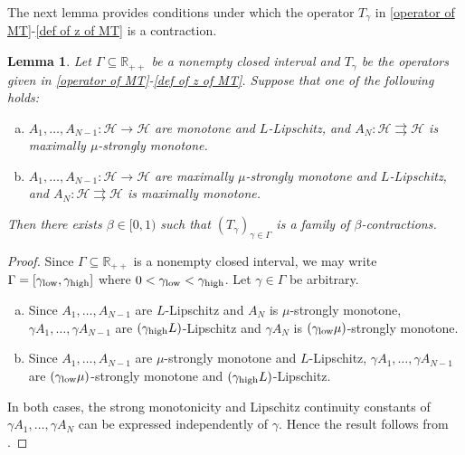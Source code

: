 \documentclass[a4paper,12pt]{article}
\newtheorem{lemma}[theorem]{Lemma}
\newcommand{\setto}{\rightrightarrows}
\begin{document}
The next lemma provides conditions under which the operator $T_\gamma$ in \eqref{operator of MT}-\eqref{def of z of MT} is a contraction.
\begin{lemma}\label{cor: MT operators satisfy contractions}
Let $\Gamma\subseteq\mathbb{R}_{++}$ be a nonempty closed interval and $T_\gamma$ be the operators given in \eqref{operator of MT}-\eqref{def of z of MT}. Suppose that one of the following holds:
\begin{enumerate}[(a)]
    \item $A_{1},\dots,A_{N-1}: \mathcal{H}\rightarrow \mathcal{H}$ are monotone and $L$-Lipschitz, and $A_{N}\colon \mathcal{H}\setto \mathcal{H}$ is maximally $\mu$-strongly monotone. 
    \item $A_{1},\dots,A_{N-1}: \mathcal{H}\rightarrow \mathcal{H}$ are maximally $\mu$-strongly monotone and $L$-Lipschitz, and $A_{N}\colon \mathcal{H}\setto \mathcal{H}$ is maximally monotone.
\end{enumerate}
Then there exists  $\beta\in[0,1)$ such that $(T_\gamma)_{\gamma\in\Gamma}$ is a family of $\beta$-contractions.
\end{lemma}
\begin{proof}
Since $\Gamma\subseteq\mathbb{R}_{++}$ is a nonempty closed interval, we may write $\Gamma=[\gamma_{\rm low},\gamma_{\rm high}]$ where $0<\gamma_{\rm low}<\gamma_{\rm high}$. Let $\gamma\in\Gamma$ be arbitrary. 
\begin{enumerate}[(a)]
\item Since $A_1,\dots,A_{N-1}$ are $L$-Lipschitz and $A_N$ is $\mu$-strongly monotone, $\gamma A_1,\dots,\gamma A_{N-1}$ are $(\gamma_{\rm high}L)$-Lipschitz and $\gamma A_N$ is $(\gamma_{\rm low}\mu)$-strongly monotone. \item  Since $A_1,\dots,A_{N-1}$ are $\mu$-strongly monotone and $L$-Lipschitz, $\gamma A_1,\dots,\gamma A_{N-1}$ are $(\gamma_{\rm low}\mu)$-strongly monotone and $(\gamma_{\rm high}L)$-Lipschitz. 
\end{enumerate}
In both cases, the strong monotonicity and Lipschitz continuity constants of $\gamma A_1,\dots,\gamma A_N$ can be expressed independently of $\gamma$. Hence the result follows from \cite[Lemma~3.4]{simi2025linear}.
\end{proof}
\end{document}
